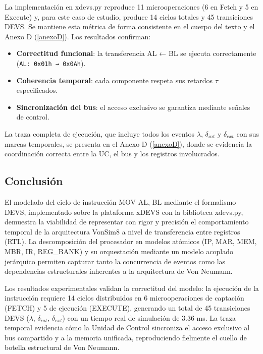 \documentclass[12pt,oneside]{templates/unerthesis}
\providecommand{\tightlist}{%
  \setlength{\itemsep}{0pt}\setlength{\parskip}{0pt}}
\begin{document}
La implementación en xdevs.py reproduce 11 microoperaciones (6 en Fetch y 5 en Execute) y, para este caso de estudio, produce 14 ciclos totales y 45 transiciones DEVS. Se mantiene esta métrica de forma consistente en el cuerpo del texto y el Anexo D (\ref{anexoD}). Los resultados confirman:

\begin{itemize}
\tightlist
\item
  \textbf{Correctitud funcional}: la transferencia AL ← BL se ejecuta correctamente (\texttt{AL:\ 0x01h\ →\ 0x0Ah}).
\item
  \textbf{Coherencia temporal}: cada componente respeta sus retardos \(\tau\) especificados.
\item
  \textbf{Sincronización del bus}: el acceso exclusivo se garantiza mediante señales de control.
\end{itemize}

La traza completa de ejecución, que incluye todos los eventos \(\lambda\), \(\delta_{int}\) y \(\delta_{ext}\) con sus marcas temporales, se presenta en el Anexo D (\ref{anexoD}), donde se evidencia la coordinación correcta entre la UC, el bus y los registros involucrados.

\hypertarget{conclusiuxf3n}{%
\subsection{Conclusión}\label{conclusiuxf3n}}

El modelado del ciclo de instrucción MOV AL, BL mediante el formalismo DEVS, implementado sobre la plataforma xDEVS con la biblioteca xdevs.py, demuestra la viabilidad de representar con rigor y precisión el comportamiento temporal de la arquitectura VonSim8 a nivel de transferencia entre registros (RTL). La descomposición del procesador en modelos atómicos (IP, MAR, MEM, MBR, IR, REG\_BANK) y su orquestación mediante un modelo acoplado jerárquico permiten capturar tanto la concurrencia de eventos como las dependencias estructurales inherentes a la arquitectura de Von Neumann.

Los resultados experimentales validan la correctitud del modelo: la ejecución de la instrucción requiere 14 ciclos distribuidos en 6 microoperaciones de captación (FETCH) y 5 de ejecución (EXECUTE), generando un total de 45 transiciones DEVS (\(\lambda\), \(\delta_{int}\), \(\delta_{ext}\)) con un tiempo real de simulación de 3.36 ms. La traza temporal evidencia cómo la Unidad de Control sincroniza el acceso exclusivo al bus compartido y a la memoria unificada, reproduciendo fielmente el cuello de botella estructural de Von Neumann.
\end{document}
